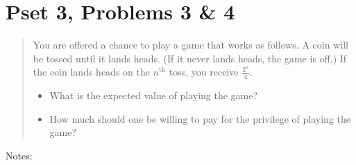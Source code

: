 \documentclass[justified]{tufte-handout}
\begin{document}
\section{Pset 3, Problems 3 \& 4}

\begin{quote}
You are offered a chance to play a game that works as follows. A coin will be tossed until it lands heads. (If it never lands heads, the game is off.) If the coin lands heads on the $n^\mathrm{th}$ toss, you receive $\frac{2^n}{4}$.

\begin{itemize}
\item What is the expected value of playing the game?
\item How much should one be willing to pay for the privilege of playing the game?\end{itemize}
\end{quote}

\noindent Notes:  \underline{\hspace{15.75cm}}\\\\\underline{\hspace{16.88cm}}\\\\\underline{\hspace{16.88cm}}\\\\\underline{\hspace{16.88cm}}\\\\\underline{\hspace{16.88cm}}\\\\\underline{\hspace{16.88cm}}\\
\end{document}
